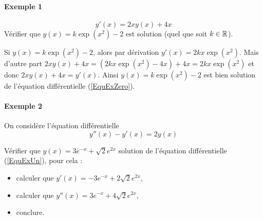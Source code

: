 \documentclass[11pt,class=report,crop=false]{standalone}
\begin{document}
\paragraph*{Exemple 1} 
\begin{equation}\label{EquExZero}
y'(x) = 2xy(x) + 4x
\end{equation}
Vérifier que $y(x) = k\exp(x^2)-2$ est solution (quel que soit $k\in\mathbb{R}$).

Si $y(x) = k\exp(x^2)-2$, alors par dérivation $y'(x) = 2kx\exp(x^2)$.
Mais d'autre part $2xy(x) + 4x = (2kx\exp(x^2)-4x) + 4x = 2kx\exp(x^2)$
et donc $2xy(x) + 4x=y'(x)$. Ainsi $y(x) = k\exp(x^2)-2$ est bien solution de l'équation différentielle (\ref{EquExZero}).



\paragraph*{Exemple 2} 
On considère l'équation différentielle 
\begin{equation}\label{EquExUn}
y''(x)-y'(x)=2y(x)
\end{equation}


Vérifier que $y(x) = 3e^{-x}+\sqrt{2}e^{2x}$ solution de l'équation différentielle (\ref{EquExUn}), pour cela :
\begin{itemize}
  \item calculer que $y'(x)=-3e^{-x}+2\sqrt{2}e^{2x}$,
  \item calculer que $y''(x)= 3e^{-x}+4\sqrt{2}e^{2x}$,
  \item conclure.
\end{itemize}

 
\end{document}

